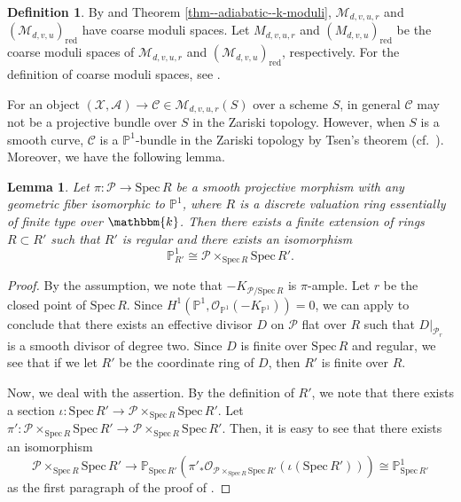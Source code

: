 \documentclass[12pt,twoside]{amsart}
\newtheorem{lem}[thm]{Lemma}
\theoremstyle{definition}
\newtheorem{defn}[thm]{Definition}
\begin{document}
\begin{defn}
By \cite{KeM} and Theorem \ref{thm--adiabatic--k-moduli}, $\mathcal{M}_{d,v,u,r}$ and $(\mathcal{M}_{d,v,u})_{\mathrm{red}}$ have coarse moduli spaces.
    Let $M_{d,v,u,r}$ and $(M_{d,v,u})_{\mathrm{red}}$ be the coarse moduli spaces of $\mathcal{M}_{d,v,u,r}$ and $(\mathcal{M}_{d,v,u})_{\mathrm{red}}$, respectively.
    For the definition of coarse moduli spaces, see \cite[Definition 11.1.1]{Ols}.
\end{defn}

For an object $(\mathcal{X},\mathcal{A})\to\mathcal{C}\in\mathcal{M}_{d,v,u,r}(S)$ over a scheme $S$, in general $\mathcal{C}$ may not be a projective bundle over $S$ in the Zariski topology. 
However, when $S$ is a smooth curve, $\mathcal{C}$ is a $\mathbb{P}^1$-bundle in the Zariski topology by Tsen's theorem (cf.~\cite[Chapter V.2]{Ha}).
Moreover, we have the following lemma.

\begin{lem}\label{lem--P^1--bundle--trivialize}
    Let $\pi\colon\mathcal{P}\to \mathrm{Spec}\,R$ be a smooth projective morphism with any geometric fiber isomorphic to $\mathbb{P}^1$, where $R$ is a discrete valuation ring essentially of finite type over $\mathbbm{k}$.
Then there exists a finite extension of rings $R\subset R'$ such that $R'$ is regular and there exists an isomorphism
    \[
    \mathbb{P}^1_{R'}\cong \mathcal{P}\times_{\mathrm{Spec}\,R}\mathrm{Spec}\,R'.
    \]
\end{lem}

\begin{proof}
By the assumption, we note that $-K_{\mathcal{P}/\mathrm{Spec}\,R}$ is $\pi$-ample.
Let $r$ be the closed point of $\mathrm{Spec}\,R$.
Since $H^1(\mathbb{P}^1,\mathcal{O}_{\mathbb{P}^1}(-K_{\mathbb{P}^1}))=0$, we can apply \cite[III Theorem 12.11]{Ha} to conclude that there exists an effective divisor $D$ on $\mathcal{P}$ flat over $R$ such that $D|_{\mathcal{P}_{r}}$ is a smooth divisor of degree two.
Since $D$ is finite over $\mathrm{Spec}\,R$ and regular, we see that if we let $R'$ be the coordinate ring of $D$, then $R'$ is finite over $R$.

Now, we deal with the assertion.
By the definition of $R'$, we note that there exists a section $\iota\colon \mathrm{Spec}\,R'\to \mathcal{P}\times_{\mathrm{Spec}\,R}\mathrm{Spec}\,R'$.
Let $\pi'\colon \mathcal{P}\times_{\mathrm{Spec}\,R}\mathrm{Spec}\,R'\to \mathcal{P}\times_{\mathrm{Spec}\,R}\mathrm{Spec}\,R'$.
Then, it is easy to see that there exists an isomorphism 
\[
\mathcal{P}\times_{\mathrm{Spec}\,R}\mathrm{Spec}\,R'\to \mathbb{P}_{\mathrm{Spec}\,R'}(\pi'_*\mathcal{O}_{\mathcal{P}\times_{\mathrm{Spec}\,R}\mathrm{Spec}\,R'}(\iota(\mathrm{Spec}\,R')))\cong \mathbb{P}^1_{\mathrm{Spec}\,R'}
\]
as the first paragraph of the proof of \cite[Proposition 4.2]{HH}.
\end{proof}
\end{document}
